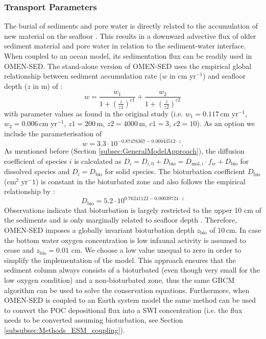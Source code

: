 \documentclass[gmd, manuscript]{copernicus}
\begin{document}
\subsubsection{Transport Parameters}
The burial of sediments and pore water is directly related to the accumulation of new material on the seafloor \citep[i.e. sedimentation,][]{burdige2006geochemistry}. 
This results in a downward advective flux of older sediment material and pore water in relation to the sediment-water interface. When coupled to an ocean model, its sedimentation flux can be readily used in OMEN-SED. 
The stand-alone version of OMEN-SED uses the empirical global relationship between sediment accumulation rate ($w$ in cm yr$^{-1}$) and seafloor depth ($z$ in m) of \citet{burwicz_estimation_2011}: 
\begin{equation}
 w = \frac{w_1}{1 + (\frac{z}{z1})^{c1}} + \frac{w_2}{1 + (\frac{z}{z2})^{c2}}\label{eq:sedimentation_rate_Burwicz}
\end{equation}
with parameter values as found in the original study (i.e. $w_1=0.117$\,cm yr$^{-1}$, $w_2=0.006$\,cm yr$^{-1}$, $z1=200$\,m, $z2=4000$\,m, $c1=3$, $c2=10$).
As an option we include the parameterisation of \citet{middelburg_empirical_1997} 
\begin{equation}
 w = 3.3\cdot 10^{-0.87478367-0.00043512\cdot z}\label{eq:sedimentation_rate}.
\end{equation}
As mentioned before (Section \ref{subsec:GeneralModelApproach}), the diffusion coefficient of species $i$ is calculated as $D_i=D_{i,0}+D_{\mathrm{bio}}=D_{\mathrm{mol},i}\cdot f_{ir}+D_{\mathrm{bio}}$ for dissolved species and $D_i=D_{\mathrm{bio}}$ for solid species. 
The bioturbation coefficient $D_{\mathrm{bio}}$ (cm$^2$ yr$^-1$) is constant in the bioturbated zone and also follows the empirical relationship by \citet{middelburg_empirical_1997}:
\begin{equation}
 D_{\mathrm{bio}} = 5.2\cdot 10^{0.76241122-0.00039724\cdot z}\label{eq:bioturbation_coeff}
\end{equation}
Observations indicate that bioturbation is largely restricted to the upper 10 cm of the sediments and is only marginally related to seafloor depth \citep[e.g.][]{boudreau_mean_1998, teal_global_2010}. 
Therefore, OMEN-SED imposes a globally invariant bioturbation depth $z_{\mathrm{bio}}$ of 10\,cm. In case the bottom water oxygen concentration is low 
\citep[here $<$4.5 nmol cm$^{-3}$ which is often used to define suboxic waters, e.g.][]{morrison1999oxygen, karstensen2008oxygen} infaunal activity is assumed to cease and $z_{\mathrm{bio}} = 0.01$ cm. We choose a low value unequal to zero in order to simplify the implementation of the model. 
This approach ensures that the sediment column always consists of a bioturbated (even though very small for the low oxygen condition) and a non-bioturbated zone, 
thus the same GBCM algorithm can be used to solve the conservation equations. Furthermore, when OMEN-SED is coupled to an Earth system model 
the same method can be used to convert the POC depositional flux into a SWI concentration (i.e. the flux needs to be converted assuming bioturbation, see Section \ref{subsubsec:Methods_ESM_coupling}). 
\end{document}
